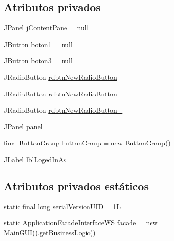 \subsection*{Atributos privados}
\begin{DoxyCompactItemize}
\item 
J\+Panel \mbox{\hyperlink{classgui_1_1_main_g_u_i_a06836509371b16181fdff6732938b7d3}{j\+Content\+Pane}} = null
\item 
J\+Button \mbox{\hyperlink{classgui_1_1_main_g_u_i_ad619899aca3a67d7a82028de85ddfbcd}{boton1}} = null
\item 
J\+Button \mbox{\hyperlink{classgui_1_1_main_g_u_i_a4ea50bfcac59d520e64e3fcfdec1457c}{boton3}} = null
\item 
J\+Radio\+Button \mbox{\hyperlink{classgui_1_1_main_g_u_i_ac5a0c08593d1be1d14216cb694dd7941}{rdbtn\+New\+Radio\+Button}}
\item 
J\+Radio\+Button \mbox{\hyperlink{classgui_1_1_main_g_u_i_a1aac1b64ce419c18765911c59fe88c19}{rdbtn\+New\+Radio\+Button\+\_}}
\item 
J\+Radio\+Button \mbox{\hyperlink{classgui_1_1_main_g_u_i_ad3dcb9314fa6097b181df71e981de64e}{rdbtn\+New\+Radio\+Button\+\_}}
\item 
J\+Panel \mbox{\hyperlink{classgui_1_1_main_g_u_i_a0fee89799e637ac087877c50b36b8fbb}{panel}}
\item 
final Button\+Group \mbox{\hyperlink{classgui_1_1_main_g_u_i_a111cafa03ab93711fb6e403de89b9f34}{button\+Group}} = new Button\+Group()
\item 
J\+Label \mbox{\hyperlink{classgui_1_1_main_g_u_i_af3b413265c0986faec49a4859f97416d}{lbl\+Loged\+In\+As}}
\end{DoxyCompactItemize}
\subsection*{Atributos privados estáticos}
\begin{DoxyCompactItemize}
\item 
static final long \mbox{\hyperlink{classgui_1_1_main_g_u_i_a75dfef8d845a0c8de7a6476c7f7d35e1}{serial\+Version\+U\+ID}} = 1L
\item 
static \mbox{\hyperlink{interfacebusiness_logic_1_1_application_facade_interface_w_s}{Application\+Facade\+Interface\+WS}} \mbox{\hyperlink{classgui_1_1_main_g_u_i_a27d911b7abcbb68661bbd3388cabcab0}{facade}} = new \mbox{\hyperlink{classgui_1_1_main_g_u_i}{Main\+G\+UI}}().\mbox{\hyperlink{classgui_1_1_main_g_u_i_a037b3ca54b0c61d6899721ff55cca365}{get\+Business\+Logic}}()
\end{DoxyCompactItemize}


